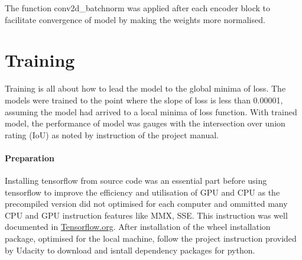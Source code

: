 \documentclass[paper=a4, fontsize=11pt]{scrartcl} %
\numberwithin{equation}{section} %
\numberwithin{figure}{section} %
\numberwithin{table}{section} %
\begin{document}
The function conv2d\_batchnorm was applied after each encoder block to facilitate convergence of model by making the weights more normalised.

\pagebreak
\section{Training}
Training is all about how to lead the model to the global minima of loss. The models were trained to the point where the slope of loss is less than 0.00001, assuming the model had arrived to a local minima of loss function. With trained model, the performance of model was gauges with the intersection over union rating (IoU) as noted by instruction of the project manual.
\paragraph{Preparation}
Installing tensorflow from source code was an essential part before using tensorflow to improve the efficiency and utilisation of GPU and CPU as the precompiled version did not optimised for each computer and ommitted many CPU and GPU instruction features like MMX, SSE\@. This instruction was well documented in \href{http://www.tensorflow.org/install/install_sources}{Tensorflow.org}. After installation of the wheel installation package, optimised for the local machine, follow the project instruction provided by Udacity to download and isntall dependency packages for python.
\end{document}
